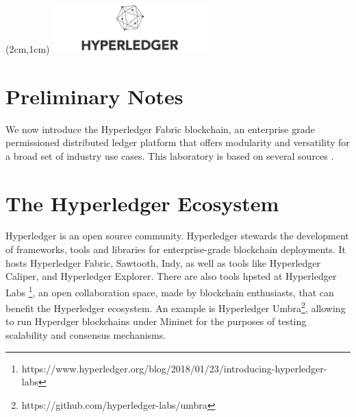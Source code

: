 \documentclass[12pt,a4paper]{article}
\theoremstyle{definition}
\begin{document}
\textblockorigin{-34pt}{-12pt}
\begin{textblock*}{10cm}(2cm,1cm)
\includegraphics[width=6cm]{hyperledger.png}
\end{textblock*}
\newtheorem{mydef}{Definition}

\section*{Preliminary Notes}
We now introduce the Hyperledger Fabric blockchain, an enterprise grade permissioned distributed ledger platform that offers modularity and versatility for a broad set of industry use cases. 
This laboratory is based on several sources \cite{belchior2019_thesis, fabric}. 






\section{The Hyperledger Ecosystem}
Hyperledger is an open source community. Hyperledger stewards the development of frameworks, tools and libraries for enterprise-grade blockchain deployments.
It hosts Hyperledger Fabric, Sawtooth, Indy, as well as tools like Hyperledger Caliper, and Hyperledger Explorer. There are also tools hpsted at Hyperledger Labs \footnote{https://www.hyperledger.org/blog/2018/01/23/introducing-hyperledger-labs}, an open collaboration space, made by blockchain enthusiasts, that can benefit the Hyperledger ecosystem. An example is Hyperledger Umbra\footnote{https://github.com/hyperledger-labs/umbra}, allowing to run Hyperdger blockchains under Mininet for the purposes of testing scalability and consensus mechanisms.
\end{document}
